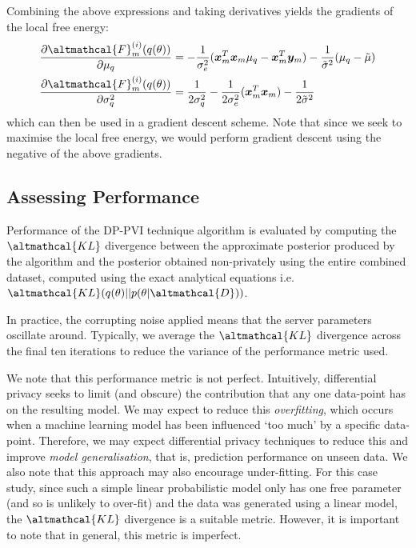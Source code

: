 Combining the above expressions and taking derivatives yields the gradients of the local free energy:
\begin{align}
\frac{\partial \altmathcal{F}_{m}^{(i)}(q(\theta))}{\partial \mu_q} &= -\frac{1}{\sigma_e^2} (\bm{x}_m^T \bm{x}_m \mu_q - \bm{x}_m^T \bm{y}_m) - \frac{1}{\tilde{\sigma}^2} (\mu_q - \tilde{\mu}) \\ 
\frac{\partial \altmathcal{F}_{m}^{(i)}(q(\theta))}{\partial \sigma_q^2} &= \frac{1}{2\sigma_q^2} -\frac{1}{2\sigma_e^2} (\bm{x}_m^T \bm{x}_m) - \frac{1}{2\tilde{\sigma}^2}
\end{align}
which can then be used in a gradient descent scheme. Note that since we seek to maximise the local free energy, we would perform gradient descent using the negative of the above gradients.

\subsection{Assessing Performance}
Performance of the DP-PVI technique algorithm is evaluated by computing the $\altmathcal{KL}$ divergence between the approximate posterior produced by the algorithm and the posterior obtained non-privately using the entire combined dataset, computed using the exact analytical equations i.e. $\altmathcal{KL}(q(\theta)||p(\theta | \altmathcal{D}))$. 

In practice, the corrupting noise applied means that the server parameters oscillate around. Typically, we average the $\altmathcal{KL}$ divergence across the final ten iterations to reduce the variance of the performance metric used. 

We note that this performance metric is not perfect. Intuitively, differential privacy seeks to limit (and obscure) the contribution that any one data-point has on the resulting model. We may expect to reduce this \emph{overfitting}, which occurs when a machine learning model has been influenced `too much' by a specific data-point. Therefore, we may expect differential privacy techniques to reduce this and improve \emph{model generalisation}, that is, prediction performance on unseen data. We also note that this approach may also encourage under-fitting. For this case study, since such a simple linear probabilistic model only has one free parameter (and so is unlikely to over-fit) and the data was generated using a linear model, the $\altmathcal{KL}$ divergence is a suitable metric. However, it is important to note that in general, this metric is imperfect.

